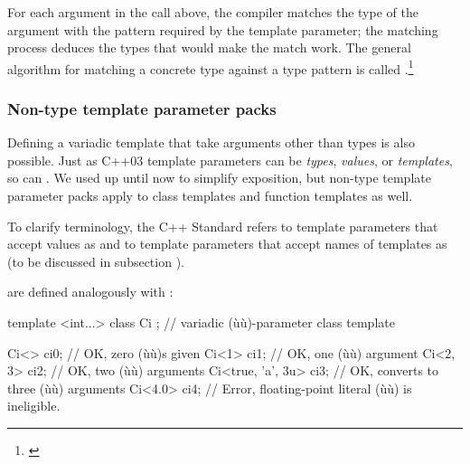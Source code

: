 \noindent For each argument in the call above, the compiler matches the type of
the argument with the pattern required by the template parameter; the
matching process deduces the types that would make the match work. The
general algorithm for matching a concrete type against a type pattern is
called .{\cprotect\footnote{\cite{bendersky18}}}

\subsubsection[Non-type template parameter packs]{Non-type template parameter packs}\label{non-type-template-parameter-packs}

Defining a variadic template that take arguments other than types is
also possible. Just as C++03 template parameters can be \emph{types},
\emph{values}, or \emph{templates}, so can . We used  up until now to
simplify exposition, but non-type template parameter packs apply to
class templates and function templates as well.

To clarify terminology, the C++ Standard refers to template parameters
that accept values as  and to
template parameters that accept names of templates as  (to be discussed in subsection
).

 are defined analogously with
:

\begin{emcppslisting}
template <int...>
class Ci { };           // variadic (ù{}ù)-parameter class template

Ci<>              ci0;  // OK, zero (ù{}ù)s given
Ci<1>             ci1;  // OK, one (ù{}ù) argument
Ci<2, 3>          ci2;  // OK, two (ù{}ù) arguments
Ci<true, 'a', 3u> ci3;  // OK, converts to three (ù{}ù) arguments
Ci<4.0>           ci4;  // Error, floating-point literal (ù{}ù) is ineligible.
\end{emcppslisting}
    

